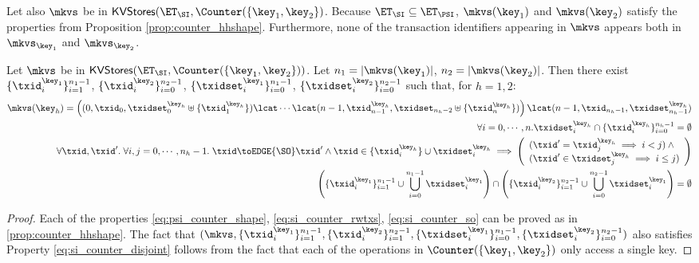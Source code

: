 Let also $\mkvs$ be in $\mathsf{KVStores}(\ET_{\SI}, \Counter(\{\key_1, \key_2\})$. Because 
$\ET_{\SI} \subseteq \ET_{\PSI}$, $\mkvs(\key_1)$ and $\mkvs(\key_2)$ satisfy the 
properties from Proposition \ref{prop:counter_hhshape}. 
Furthermore, none of the transaction identifiers appearing in $\mkvs$ appears 
both in $\mkvs_{\key_1}$ and $\mkvs_{\key_2}$.
\begin{proposition}
\label{prop:si_counter_hhshape1}
Let $\mkvs$ be in $\mathsf{KVStores}(\ET_{\SI}, \Counter(\{\key_1, \key_2\}))$. 
Let $n_1 = \lvert \mkvs(\key_1) \rvert$, $n_2 = \lvert \mkvs(\key_2) \rvert$. 
Then there exist $\{\txid_{i}^{\key_1}\}_{i=1}^{n_1 - 1}$, $\{\txid_{i}^{\key_2}\}_{i=0}^{n_2 - 1}$, 
$\{\txidset_{i}^{\key_1}\}_{i=0}^{n_1-1}$, $\{\txidset_{i}^{\key_2}\}_{i=0}^{n_2 - 1}$ such that, 
for $h = 1,2$: 
\begin{align}
\mkvs(\key_{h}) = \left( (0, \txid_{0}, \txidset^{\key_{h}}_{0} \uplus \{\txid^{\key_{h}}_1\}) \lcat \cdots \lcat (n-1, \txid^{\key_{h}}_{n-1}, \txidset_{n_{h}-2} \uplus \{\txid^{\key_{h}}_{n}\}) \right) 
\lcat (n-1, \txid_{n_{h} - 1}, \txidset^{\key_{h}}_{n_{h} - 1}) \label{eq:si_counter_shape}\\
\forall i=0,\cdots,n.\txidset^{\key_{h}}_{i} \cap \{\txid^{\key_{h}}_{i}\}_{i=0}^{n_{h}-1} = \emptyset \label{eq:si_counter_rwtxs}\\
\forall \txid, \txid'.\;\forall i,j=0,\cdots, n_{h} - 1.\; \txid \toEDGE{\SO} \txid' 
\wedge \txid \in \{\txid^{\key_{h}}_{i}\} \cup \txidset^{\key_{h}}_{i} \implies 
\left(\begin{array}{l}
(\txid' = \txid^{\key_{h}}_{j} \implies i < j) \wedge {} \\
(\txid' \in \txidset^{\key_{h}}_{j} \implies i \leq j) \\
\end{array}\right) \label{eq:si_counter_so}\\
\left( \{\txid^{\key_{1}}_{i}\}_{i=1}^{n_1 -1} \cup \bigcup_{i=0}^{n_1 - 1} \txidset_{i}^{\key_1} \right) \cap 
\left( \{\txid^{\key_{2}}_{i}\}_{i=1}^{n_2 -1} \cup \bigcup_{i=0}^{n_2 - 1} \txidset_{i}^{\key_1} \right) = \emptyset \label{eq:si_counter_disjoint}
\end{align}

\end{proposition}

\begin{proof}
Each of the properties \eqref{eq:psi_counter_shape}, \eqref{eq:si_counter_rwtxs}, \eqref{eq:si_counter_so} 
can be proved as in \cref{prop:counter_hhshape}. The fact that $(\mkvs, \{\txid_{i}^{\key_{1}}\}_{i=1}^{n_1 - 1}, \{\txid^{\key_2}_{i}\}_{i=1}^{n_2 - 1}, 
\{\txidset_{i}^{\key_1}\}_{i=0}^{n_1 - 1}, \{\txidset_{i}^{\key_2}\}_{i=0}^{n_2-1})$ also satisfies Property \eqref{eq:si_counter_disjoint} 
follows from the fact that each of the operations in $\Counter(\{\key_1, \key_2\})$ only access a single key. 
\end{proof}

